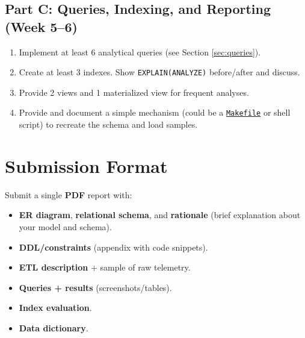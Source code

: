 \documentclass[11pt]{article}
\begin{document}
\subsection*{Part C: Queries, Indexing, and Reporting (Week 5--6)}
\begin{enumerate}[leftmargin=*]
  \item Implement at least 6 analytical queries (see Section \ref{sec:queries}).
  \item Create at least 3 indexes. Show \texttt{EXPLAIN(ANALYZE)} before/after and discuss.
  \item Provide 2 views and 1 materialized view for frequent analyses.
  \item Provide and document a simple mechanism (could be a \href{https://en.wikipedia.org/wiki/Make_(software)}{\texttt{Makefile}} or shell script) to recreate the schema and load samples.
\end{enumerate}

\section{Submission Format}

Submit a single \textbf{\large PDF} report with:
\begin{itemize}[leftmargin=*]
  \item \textbf{ER diagram}, \textbf{relational schema}, and \textbf{rationale} (brief explanation about your model and schema).
  \item \textbf{DDL/constraints} (appendix with code snippets).
  \item \textbf{ETL description} + sample of raw telemetry.
  \item \textbf{Queries + results} (screenshots/tables).
  \item \textbf{Index evaluation}.
  \item \textbf{Data dictionary}.
\end{itemize}
\end{document}
